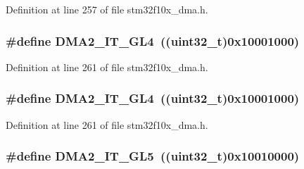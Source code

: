 Definition at line 257 of file stm32f10x\+\_\+dma.\+h.

\subsubsection[{\texorpdfstring{D\+M\+A2\+\_\+\+I\+T\+\_\+\+G\+L4}{DMA2_IT_GL4}}]{\setlength{\rightskip}{0pt plus 5cm}\#define D\+M\+A2\+\_\+\+I\+T\+\_\+\+G\+L4~(({\bf uint32\+\_\+t})0x10001000)}\hypertarget{group___d_m_a__interrupts__definition_ga004761fbcd7dba2f242639b2992ada17}{}\label{group___d_m_a__interrupts__definition_ga004761fbcd7dba2f242639b2992ada17}


Definition at line 261 of file stm32f10x\+\_\+dma.\+h.

\subsubsection[{\texorpdfstring{D\+M\+A2\+\_\+\+I\+T\+\_\+\+G\+L4}{DMA2_IT_GL4}}]{\setlength{\rightskip}{0pt plus 5cm}\#define D\+M\+A2\+\_\+\+I\+T\+\_\+\+G\+L4~(({\bf uint32\+\_\+t})0x10001000)}\hypertarget{group___d_m_a__interrupts__definition_ga004761fbcd7dba2f242639b2992ada17}{}\label{group___d_m_a__interrupts__definition_ga004761fbcd7dba2f242639b2992ada17}


Definition at line 261 of file stm32f10x\+\_\+dma.\+h.

\subsubsection[{\texorpdfstring{D\+M\+A2\+\_\+\+I\+T\+\_\+\+G\+L5}{DMA2_IT_GL5}}]{\setlength{\rightskip}{0pt plus 5cm}\#define D\+M\+A2\+\_\+\+I\+T\+\_\+\+G\+L5~(({\bf uint32\+\_\+t})0x10010000)}\hypertarget{group___d_m_a__interrupts__definition_ga2205d7e002767d98f7aa206634374082}{}\label{group___d_m_a__interrupts__definition_ga2205d7e002767d98f7aa206634374082}


